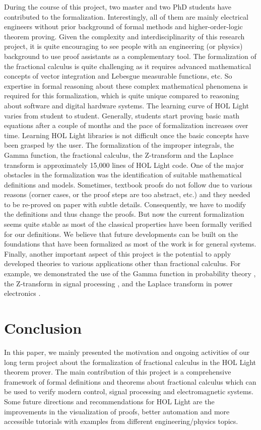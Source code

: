 \documentclass {llncs}
\begin{document}
During the course of this project, two master and two PhD students have contributed to the formalization.
Interestingly, all of them are mainly electrical engineers without prior background of formal methods and
higher-order-logic theorem proving. Given the complexity and interdisciplinarity of this research project, it
is quite encouraging
to see people with an engineering (or physics) background
to use proof assistants as a complementary tool.
The formalization of the fractional calculus is quite challenging
 as it requires advanced mathematical concepts of vector
 integration and Lebesgue measurable functions, etc. So expertise in
 formal reasoning about these complex mathematical phenomena
is required for this formalization, which is quite
 unique compared to reasoning about software and digital hardware systems.
The learning curve of HOL Light varies from student to student.
 Generally, students start proving basic math equations after a
 couple of months and the pace of formalization increases over time.
 Learning HOL Light libraries is not difficult once the basic
 concepts have been grasped by the user.
 The formalization of the improper integrals, the Gamma function, the fractional
 calculus, the Z-transform and the Laplace transform is approximately 15,000 lines of HOL Light code.
 One of the major obstacles in the formalization was the identification of suitable
 mathematical definitions and models.
Sometimes, textbook proofs do not follow due to various reasons
 (corner cases, or the proof steps are too abstract, etc.) and they needed
 to be re-proved on paper with subtle details.
Consequently, we have to modify the definitions and thus change the proofs.
 But now the current formalization seems quite stable as most of the classical properties
 have been formally verified for our definitions. We believe that future
 developments can be built on the foundations that have been formalized
 as most of the work is for general systems. Finally, another important aspect of this project is
the potential to apply developed theories to various applications other than fractional calculus. For example, we
demonstrated the use of the Gamma function in probability theory \cite{Umair_Gamma},
the Z-transform in signal processing \cite{umair_itp_z}, and the Laplace transform in power electronics \cite{laplace_lpar}.





\section{Conclusion} \label{sec:conclusion}
In this paper, we mainly presented the motivation and ongoing activities of
our long term project about the formalization of fractional calculus in the
HOL Light theorem prover.
The main contribution of this project is a comprehensive framework of formal definitions
and theorems about fractional calculus which can be used
to verify modern control, signal processing and electromagnetic systems.
Some future directions and recommendations for HOL Light are
 the improvements in the  visualization of
 proofs, better automation and more accessible tutorials with examples
 from different engineering/physics topics.




\end{document}
